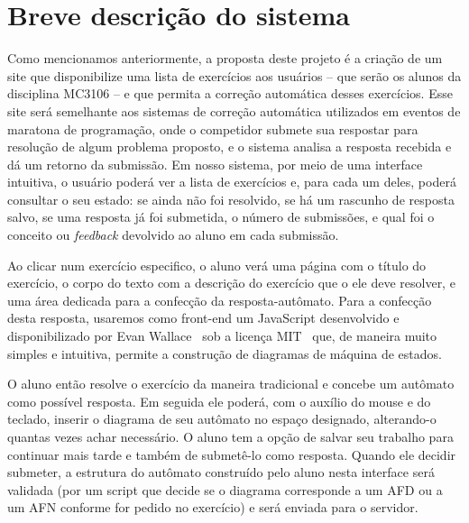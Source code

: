 \documentclass[
	12pt,				%
	openany,
	oneside,
	a4paper,			%
	english,			%
	brazil,				%
	]{abntex2}
\begin{document}
\section {Breve descrição do sistema}

Como mencionamos anteriormente, a proposta deste projeto é a criação de um site que disponibilize uma lista de exercícios aos usuários -- que serão os alunos da disciplina MC3106 -- e que permita a correção automática desses exercícios. Esse site será semelhante aos sistemas de correção automática utilizados em eventos de maratona de programação, onde o competidor submete sua respostar para resolução de algum problema proposto, e o sistema analisa a resposta recebida e dá um retorno da submissão. Em nosso sistema, por meio de uma interface intuitiva, o usuário poderá ver a lista de exercícios e, para cada um deles, poderá consultar o seu estado: se ainda não foi resolvido, se há um rascunho de resposta salvo, se uma resposta já foi submetida, o número de submissões, e qual foi o conceito ou \emph{feedback} devolvido ao aluno em cada submissão.



Ao clicar num exercício especifico, o aluno verá uma página com o título do exercício, o corpo do texto com a descrição do exercício que o ele deve resolver, e uma área dedicada para a confecção da resposta-autômato. Para a confecção desta resposta, usaremos como front-end um JavaScript desenvolvido e disponibilizado por Evan Wallace~\cite{evan} sob a licença MIT~\cite{mit} que, de maneira muito simples e intuitiva, permite a construção de diagramas de máquina de estados.

O aluno então resolve o exercício da maneira tradicional e concebe um autômato como possível resposta. Em seguida ele poderá, com o auxílio do mouse e do teclado, inserir o diagrama de seu autômato no espaço designado, alterando-o quantas vezes achar necessário. O aluno tem a opção de salvar seu trabalho para continuar mais tarde e também de submetê-lo como resposta. Quando ele decidir submeter, a estrutura do autômato construído pelo aluno nesta interface será validada (por um script que decide se o diagrama corresponde a um AFD ou a um AFN conforme for pedido no exercício) e será enviada para o servidor.
\end{document}
